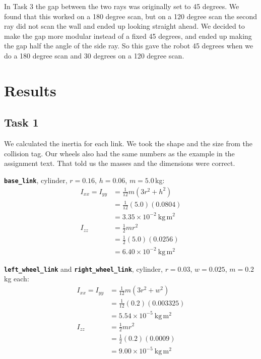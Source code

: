 \documentclass[conference]{IEEEtran}
\begin{document}
In Task 3 the gap between the two rays was originally set to 45 degrees. We found
that this worked on a 180 degree scan, but on a 120 degree scan the second ray did
not scan the wall and ended up looking straight ahead. We decided to make the gap
more modular instead of a fixed 45 degrees, and ended up making the gap half the
angle of the side ray. So this gave the robot 45 degrees when we do a 180 degree
scan and 30 degrees on a 120 degree scan.

\section{Results}

\subsection{Task 1}
We calculated the inertia for each link. We took the shape and the size
from the collision tag. Our wheels also had the same
numbers as the example in the assignment text. That told us the masses and the
dimensions were correct. 

\smallskip
\textbf{\texttt{base\_link}}, cylinder, \mbox{$r=0.16$}, \mbox{$h=0.06$},
\mbox{$m=5.0$\,kg}:
\begin{align*}
I_{xx}=I_{yy} &= \frac{1}{12}m(3r^2+h^2) \\
              &= \frac{1}{12}(5.0)(0.0804) \\
              &= 3.35\times10^{-2}~\mathrm{kg\,m^2} \\[4pt]
I_{zz}        &= \frac{1}{2}mr^2 \\
              &= \frac{1}{2}(5.0)(0.0256) \\
              &= 6.40\times10^{-2}~\mathrm{kg\,m^2}
\end{align*}

\smallskip
\textbf{\texttt{left\_wheel\_link}} and \textbf{\texttt{right\_wheel\_link}},
cylinder, \mbox{$r=0.03$}, \mbox{$w=0.025$}, \mbox{$m=0.2$\,kg} each:
\begin{align*}
I_{xx}=I_{yy} &= \frac{1}{12}m(3r^2+w^2) \\
              &= \frac{1}{12}(0.2)(0.003325) \\
              &= 5.54\times10^{-5}~\mathrm{kg\,m^2} \\[4pt]
I_{zz}        &= \frac{1}{2}mr^2 \\
              &= \frac{1}{2}(0.2)(0.0009) \\
              &= 9.00\times10^{-5}~\mathrm{kg\,m^2}
\end{align*}
\end{document}
